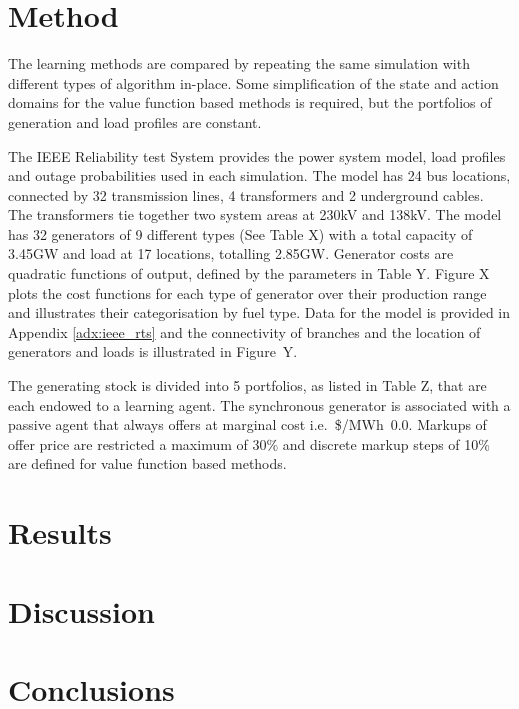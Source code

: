 \section{Method}
The learning methods are compared by repeating the same simulation with
different types of algorithm in-place.  Some simplification of the state
and action domains for the value function based methods is required, but the
portfolios of generation and load profiles are constant.

The IEEE Reliability test System \cite{ieee79rts} provides the power system
model, load profiles and outage probabilities used in each simulation.  The
model has 24 bus locations, connected by 32 transmission lines, 4 transformers
and 2 underground cables.  The transformers tie together two system areas at
230kV and 138kV.  The model has 32 generators of 9 different types (See Table
X) with a total capacity of 3.45GW and load at 17 locations, totalling 2.85GW.
Generator costs are quadratic functions of output, defined by the parameters in
Table Y.  Figure X plots the cost functions for each type of generator over
their production range and illustrates their categorisation by fuel type.  Data
for the model is provided in Appendix \ref{adx:ieee_rts} and the connectivity
of branches and the location of generators and loads is illustrated in
Figure~Y.

The generating stock is divided into 5 portfolios, as listed in Table Z, that
are each endowed to a learning agent.  The synchronous generator is associated
with a passive agent that always offers at marginal cost i.e.~\$/MWh~0.0.
Markups of offer price are restricted a maximum of 30\% and discrete markup
steps of 10\% are defined for value function based methods.

%


\section{Results}
\section{Discussion}
\label{sec:discuss}
\section{Conclusions}
